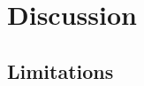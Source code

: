 \chapter{Discussion}
\label{chap:discussion}

\section{Limitations}
\label{sec:discussion-limitations}
